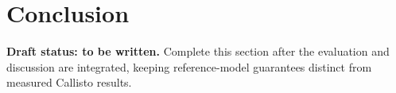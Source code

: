 \section{Conclusion}
\label{sec:conclusion}
\noindent\textbf{Draft status: to be written.}
Complete this section after the evaluation and discussion are integrated,
keeping reference-model guarantees distinct from measured Callisto results.
